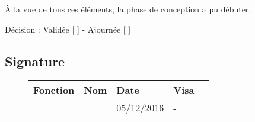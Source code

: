 \documentclass[asi, sansVersion]{picInsa}
\begin{document}
À la vue de tous ces éléments, la phase de conception a pu débuter.

\begin{center}
Décision : Validée [ \checkmark{} ] - Ajournée [ ]
\end{center}

\subsection*{Signature}
\begin{figure}[H]
		\centering
		\begin{tabularx}{17cm}{|p{4cm}|X|X|X|X|}
		\hline
		\rowcolor[gray]{0.85} Fonction & Nom & Date & Visa \\
		\hline
		\CP{} & \Pierre{} & 05/12/2016 & - \\
		\hline
		\end{tabularx}
\end{figure}
\end{document}
